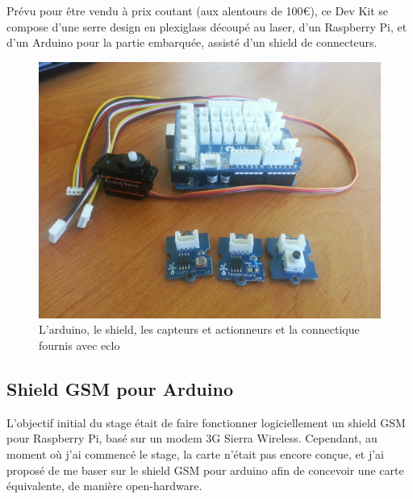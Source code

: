 \documentclass{article}
\begin{document}
Prévu pour être vendu à prix coutant (aux alentours de 100€), ce Dev Kit se compose d’une serre design en plexiglass découpé au laser, d’un Raspberry Pi, et d’un Arduino pour la partie embarquée, assisté d’un shield de connecteurs.

\begin{figure}[h!]
    \centering\includegraphics[width=\linewidth*2/3]{img/arduino_shield.jpg}
    \caption{L’arduino, le shield, les capteurs et actionneurs et la connectique fournis avec eclo}
\end{figure}

\clearpage

\subsection{Shield GSM pour Arduino}
\label{gsm}

L’objectif initial du stage était de faire fonctionner logiciellement un shield GSM pour Raspberry Pi, basé sur un modem 3G Sierra Wireless. Cependant, au moment où j’ai commencé le stage, la carte n’était pas encore conçue, et j’ai proposé de me baser sur le shield GSM pour arduino afin de concevoir une carte équivalente, de manière open-hardware.
\end{document}
